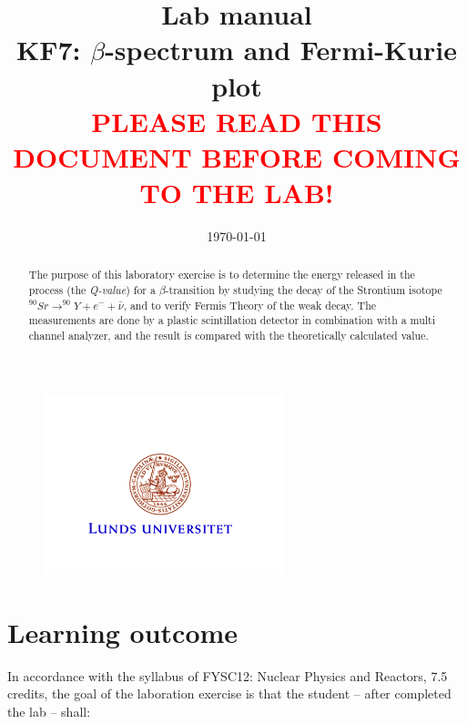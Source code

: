 \documentclass[a4,11pt, notitlepage]{article}
\begin{document}
 
 

\title{\huge{Lab manual
\\KF7: $\beta$-spectrum and Fermi-Kurie plot
\vspace{1cm}
\\\textcolor{red}{PLEASE READ THIS DOCUMENT BEFORE COMING TO THE LAB!}}}
\date{\today}
\maketitle

\vspace{10pt}
\begin{abstract}
The purpose of this laboratory exercise is to determine the energy released in the process (the \textit{Q-value}) for a $\beta$-transition by studying the decay of the Strontium isotope 
\\$^{90}Sr\rightarrow ^{90}Y + e^- + \bar{\nu}$, and to verify Fermis Theory of
the weak decay.
The measurements are done by a plastic scintillation detector in combination with a multi channel analyzer, and the result is compared with the theoretically calculated value. 
\end{abstract}

\begin{figure}[htp]
  \vspace{40pt}
  \begin{center}
    \includegraphics[width=7.0cm]{figures/LU.png}
  \end{center}
\end{figure}

\thispagestyle{empty}

\pagebreak
\tableofcontents 
\pagebreak
\section{Learning outcome}

In accordance with the syllabus of FYSC12: Nuclear Physics and Reactors, 7.5
credits, the goal of the laboration exercise is that the student -- after
completed the lab -- shall:
\end{document}
